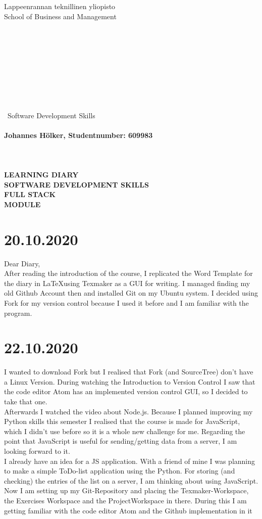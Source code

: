 \documentclass{article}
\begin{document}
\begin{Large}
Lappeenrannan teknillinen yliopisto\\
School of Business and Management
\\\\\\\\\\\\\\\\\\\\\
Software Development Skills\\\\
\textbf{Johannes Hölker, Studentnumber: 609983}\\\\\\\\
\textbf{LEARNING DIARY\\ SOFTWARE DEVELOPMENT SKILLS\\ FULL STACK\\MODULE}
\end{Large}

\newpage 


\tableofcontents

\newpage

\section{20.10.2020} 
Dear Diary,\\
After reading the introduction of the course, I replicated the Word Template for the diary in \LaTeX using Texmaker as a GUI for writing. I managed finding my old Github Account then and installed Git on my Ubuntu system. I decided using Fork for my version control because I used it before and I am familiar with the program.
\section{22.10.2020}
I wanted to download Fork but I realised that Fork (and SourceTree) don't have a Linux Version. During watching the Introduction to Version Control I saw that the code editor Atom has an implemented version control GUI, so I decided to take that one.\\
Afterwards I watched the video about Node.js. Because I planned improving my Python skills this semester I realised that the course is made for JavaScript, which I didn't use before so it is a whole new challenge for me. Regarding the point that JavaScript is useful for sending/getting data from a server, I am looking forward to it.\\
I already have an idea for a JS application. With a friend of mine I was planning to make a simple ToDo-list application using the Python. For storing (and checking) the entries of the list on a server, I am thinking about using JavaScript.\\
Now I am setting up my Git-Repository and placing the Texmaker-Workspace, the Exercises Workspace and the ProjectWorkspace in there. During this I am getting familiar with the code editor Atom and the Github implementation in it

\pagebreak 
%
\end{document}
